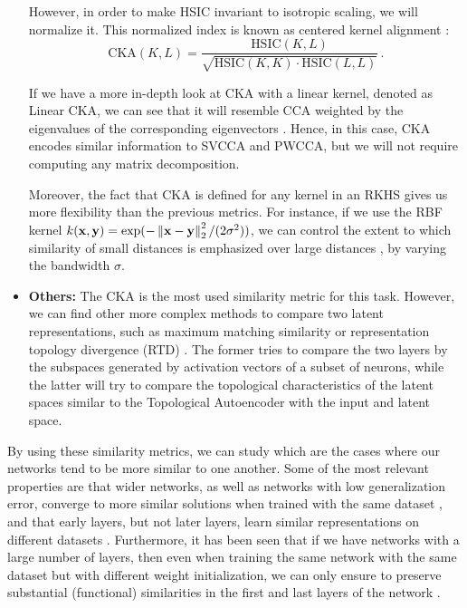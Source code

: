\documentclass[../main.tex]{subfiles}
\begin{document}
\begin{itemize}
    However, in order to make HSIC invariant to isotropic scaling, we will normalize it. This normalized index is known as centered kernel alignment \cite{kornblith_similarity_2019}:
    \begin{equation}
    \label{eq:CKA}
    \text{CKA}(K, L) = \frac{\text{HSIC}(K,L)}{\sqrt{\text{HSIC}(K,K) \cdot \text{HSIC}(L,L)}}\,.    
    \end{equation}


    If we have a more in-depth look at CKA with a linear kernel, denoted as Linear CKA, we can see that it will resemble CCA weighted by the eigenvalues of the corresponding eigenvectors \cite{kornblith_similarity_2019}. Hence, in this case, CKA encodes similar information to SVCCA and PWCCA, but we will not require computing any matrix decomposition.
    
    Moreover, the fact that CKA is defined for any kernel in an RKHS gives us more flexibility than the previous metrics. For instance, if we use the RBF kernel $k(\mathbf{x}, \mathbf{y}) = \exp(-\left\lVert \mathbf{x}-\mathbf{y} \right\rVert_2^2/(2\sigma^2))$, we can control the extent to which similarity of small distances is emphasized over large distances \cite{kornblith_similarity_2019}, by varying the bandwidth $\sigma$.
    
    \item \textbf{Others:} The CKA is the most used similarity metric for this task. However, we can find other more complex methods to compare two latent representations, such as maximum matching similarity \cite{wang_towards_2018} or representation topology divergence (RTD) \cite{barannikov_representation_2022}. The former tries to compare the two layers by the subspaces generated by activation vectors of a subset of neurons, while the latter will try to compare the topological characteristics of the latent spaces similar to the Topological Autoencoder with the input and latent space.
    
\end{itemize}


By using these similarity metrics, we can study which are the cases where our networks tend to be more similar to one another. Some of the most relevant properties are that wider networks, as well as networks with low generalization error, converge to more similar solutions when trained with the same dataset \cite{morcos_insights_2018}, and that early layers, but not later layers, learn similar representations on different datasets \cite{barannikov_representation_2022}. Furthermore, it has been seen that if we have networks with a large number of layers, then even when training the same network with the same dataset but with different weight initialization, we can only ensure to preserve substantial (functional) similarities in the first and last layers of the network \cite{wang_towards_2018}.
\end{document}
